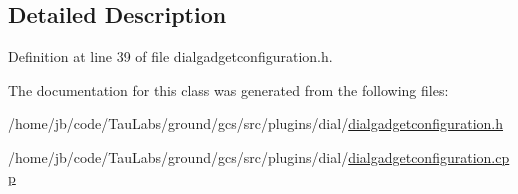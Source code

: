 \subsection{\-Detailed \-Description}


\-Definition at line 39 of file dialgadgetconfiguration.\-h.



\-The documentation for this class was generated from the following files\-:\begin{DoxyCompactItemize}
\item 
/home/jb/code/\-Tau\-Labs/ground/gcs/src/plugins/dial/\hyperlink{dialgadgetconfiguration_8h}{dialgadgetconfiguration.\-h}\item 
/home/jb/code/\-Tau\-Labs/ground/gcs/src/plugins/dial/\hyperlink{dialgadgetconfiguration_8cpp}{dialgadgetconfiguration.\-cpp}\end{DoxyCompactItemize}
